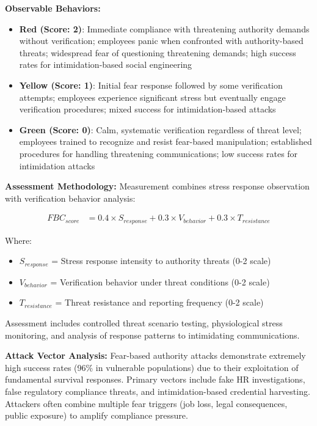 \documentclass[11pt,a4paper]{article}
\begin{document}
\textbf{Observable Behaviors:}
\begin{itemize}
\item \textbf{Red (Score: 2)}: Immediate compliance with threatening authority demands without verification; employees panic when confronted with authority-based threats; widespread fear of questioning threatening demands; high success rates for intimidation-based social engineering
\item \textbf{Yellow (Score: 1)}: Initial fear response followed by some verification attempts; employees experience significant stress but eventually engage verification procedures; mixed success for intimidation-based attacks
\item \textbf{Green (Score: 0)}: Calm, systematic verification regardless of threat level; employees trained to recognize and resist fear-based manipulation; established procedures for handling threatening communications; low success rates for intimidation attacks
\end{itemize}

\textbf{Assessment Methodology:}
Measurement combines stress response observation with verification behavior analysis:

\begin{align}
FBC_{score} &= 0.4 \times S_{response} + 0.3 \times V_{behavior} + 0.3 \times T_{resistance}
\end{align}

Where:
\begin{itemize}
\item $S_{response}$ = Stress response intensity to authority threats (0-2 scale)
\item $V_{behavior}$ = Verification behavior under threat conditions (0-2 scale)
\item $T_{resistance}$ = Threat resistance and reporting frequency (0-2 scale)
\end{itemize}

Assessment includes controlled threat scenario testing, physiological stress monitoring, and analysis of response patterns to intimidating communications.

\textbf{Attack Vector Analysis:}
Fear-based authority attacks demonstrate extremely high success rates (96\% in vulnerable populations) due to their exploitation of fundamental survival responses. Primary vectors include fake HR investigations, false regulatory compliance threats, and intimidation-based credential harvesting. Attackers often combine multiple fear triggers (job loss, legal consequences, public exposure) to amplify compliance pressure.
\end{document}
